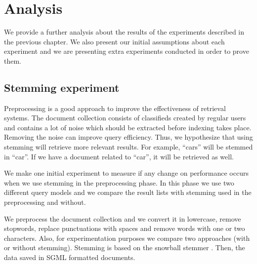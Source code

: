 \chapter{Analysis}

We provide a further analysis about the results of the experiments described in the previous chapter. We also present our initial assumptions about each experiment and we are presenting extra experiments conducted in order to prove them.

\section{Stemming experiment}

Preprocessing is a good approach to improve the effectiveness of retrieval systems. The document collection consists of classifieds created by regular users and contains a lot of noise which should be extracted before indexing takes place. Removing the noise can improve query efficiency. Thus, we hypothesize that using stemming will retrieve more relevant results. For example, ``cars'' will be stemmed in ``car''. If we have a document related to ``car'', it will be retrieved as well.

We make one initial experiment to measure if any change on performance occurs when we use stemming in the preprocessing phase. In this phase we use two different query models and we compare the result lists with stemming used in the preprocessing and without.

We preprocess the document collection and we convert it in lowercase, remove stopwords, replace punctuations with spaces and remove words with one or two characters. Also, for experimentation purposes we compare two approaches (with or without  stemming). Stemming is based on the snowball stemmer \cite{Snowball}. Then, the data saved in SGML formatted documents.

